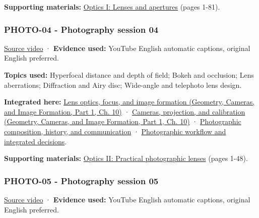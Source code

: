 \textbf{Supporting materials:} \href{https://drive.google.com/file/d/0B6w2XfPHEcZYT0dwaFF4emd6Vzg/view?usp=sharing}{Optics I: Lenses and apertures} (pages 1-81).

\subsubsection{PHOTO-04 - Photography session 04}\label{04-visual-computing-ii-ch036-photo-04---photography-session-04}

\hypertarget{04-visual-computing-ii-ch036-photo-04---photography-session-04}{}

\href{https://www.youtube.com/watch?v=Y6kwPir0uMM}{Source video} · \textbf{Evidence used:} YouTube English automatic captions, original English preferred.

\textbf{Topics used:} Hyperfocal distance and depth of field; Bokeh and occlusion; Lens aberrations; Diffraction and Airy disc; Wide-angle and telephoto lens design.

\textbf{Integrated here:} \href{../03-Geometry-Cameras-and-Image-Formation-P01/main.pdf\#nameddest=03-visual-computing-i-ch003-lens-optics-focus-and-image-formation}{Lens optics, focus, and image formation (Geometry, Cameras, and Image Formation, Part 1, Ch. 10)} · \href{../03-Geometry-Cameras-and-Image-Formation-P01/main.pdf\#nameddest=03-visual-computing-i-ch003-cameras-projection-and-calibration}{Cameras, projection, and calibration (Geometry, Cameras, and Image Formation, Part 1, Ch. 10)} · \hyperref[04-visual-computing-ii-ch034-photographic-composition-history-and-communication]{Photographic composition, history, and communication} · \hyperref[04-visual-computing-ii-ch034-photographic-workflow-and-integrated-decisions]{Photographic workflow and integrated decisions}.

\textbf{Supporting materials:} \href{https://drive.google.com/open?id=0B6w2XfPHEcZYTnZIR2VpWThHM0U}{Optics II: Practical photographic lenses} (pages 1-48).

\subsubsection{PHOTO-05 - Photography session 05}\label{04-visual-computing-ii-ch036-photo-05---photography-session-05}

\hypertarget{04-visual-computing-ii-ch036-photo-05---photography-session-05}{}

\href{https://www.youtube.com/watch?v=VCcDJAiObEw}{Source video} · \textbf{Evidence used:} YouTube English automatic captions, original English preferred.

